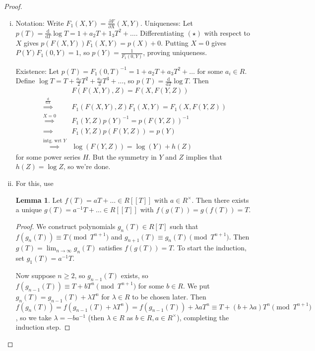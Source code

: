 \documentclass{article}
\theoremstyle{definition}
\newtheorem{lemma}[theorem]{Lemma}
\begin{document}
\begin{proof}
    \begin{enumerate}[(i)]
        \item Notation: Write $F_1(X,Y) = \frac{\partial F}{\partial X}(X,Y)$. Uniqueness: Let $p(T) = \frac{\mathrm{d}}{\mathrm{d}T}\log T = 1 + a_2 T + 1_3 T^2 + \ldots$. Differentiating $(\star)$ with respect to $X$ gives $p(F(X,Y))F_1(X,Y) = p(X) + 0$. Putting $X=0$ gives $P(Y)F_1(0,Y)=1$, so $p(Y) = \frac{1}{F_1(0,Y)}$, proving uniqueness.
        \vspace{1mm}
         
        Existence: Let $p(T) = F_1(0,T)^{-1} = 1 + a_2T + a_3T^2 + \ldots$ for some $a_i \in R$. Define $\log T = T + \frac{a_2}{2}T^2 + \frac{a_3}{3}T^3 + \ldots$, so $p(T) = \frac{\mathrm{d}}{\mathrm{d}T}\log T$. Then 
        \begin{align*}
            &F(F(X,Y),Z) = F(X,F(Y,Z)) \\
            \stackrel{\frac{\mathrm{d}}{\mathrm{d}X}}{\implies}& F_1(F(X,Y),Z)F_1(X,Y) = F_1(X,F(Y,Z))\\
            \stackrel{X=0}{\implies}& F_1(Y,Z)p(Y)^{-1} = p(F(Y,Z))^{-1}\\
            \implies& F_1(Y,Z)p(F(Y,Z)) = p(Y) \\
            \stackrel{\text{intg. wrt }Y}{\implies}& \log(F(Y,Z)) = \log(Y) + h(Z) 
        \end{align*}
        for some power series $H$. But the symmetry in $Y$ and $Z$ implies that $h(Z)=\log Z$, so we're done.
        
        \item For this, use
        \begin{lemma}\label{lemma8.4}
            Let $f(T) = aT + \ldots \in R[[T]]$ with $a \in R^\times$. Then there exists a unique $g(T) = a^{-1}T + \ldots \in R[[T]]$ with $f(g(T))=g(f(T))=T$.
        \end{lemma}
        \begin{proof}
            We construct polynomials $g_{n}(T) \in R[T]$ such that $f(g_n(T)) \equiv T \pmod{T^{n+1}}$ and $g_{n+1}(T) \equiv g_n(T) \pmod{T^{n+1}}$. Then $g(T) = \lim_{n \to \infty}g_n(T)$ satisfies $f(g(T))=T$. To start the induction, set $g_1(T) = a^{-1}T$.
            \vspace{1mm}
             
            Now suppose $n\ge 2$, so $g_{n-1}(T)$ exists, so $f(g_{n-1}(T)) \equiv T + bT^n \pmod{T^{n+1}}$ for some $b \in R$. We put $g_n(T) = g_{n-1}(T) + \lambda T^n$ for $\lambda \in R$ to be chosen later. Then $f(g_n(T)) = f(g_{n-1}(T)+\lambda T^n) = f(g_{n-1}(T)) + \lambda a T^n \equiv T + (b+\lambda a)T^n\pmod{T^{n+1}}$, so we take $\lambda = -ba^{-1}$ (then $\lambda \in R$ as $b \in R, a \in R^\times$), completing the induction step.
            \vspace{1mm}
             

\end{proof}
\end{enumerate}
\end{proof}
\end{document}
